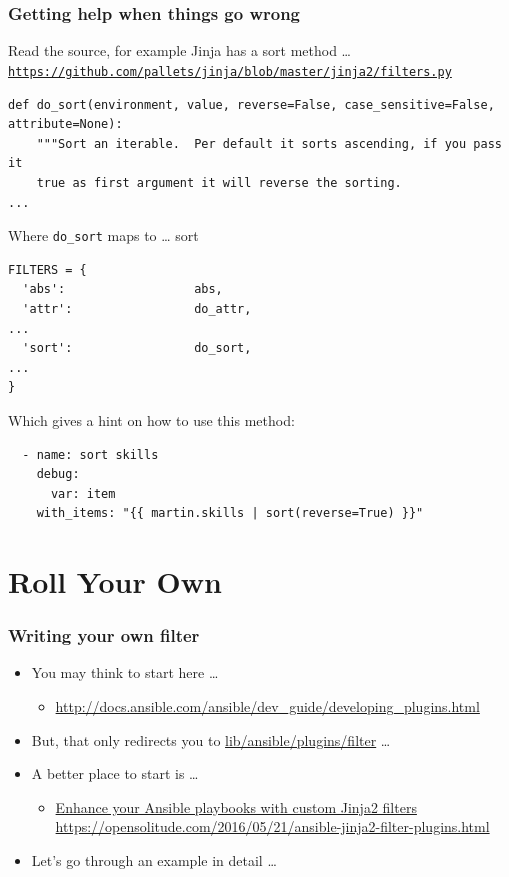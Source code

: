\documentclass[pdf]{beamer}
\begin{document}
\begin{frame}[fragile]
  \frametitle{Getting help when things go wrong}
  Read the source, for example Jinja has a sort method \ldots \newline
  \texttt{
    \tiny \url{https://github.com/pallets/jinja/blob/master/jinja2/filters.py}
  }
  \begin{lstlisting}
def do_sort(environment, value, reverse=False, case_sensitive=False, attribute=None):
    """Sort an iterable.  Per default it sorts ascending, if you pass it
    true as first argument it will reverse the sorting.
...
  \end{lstlisting}
  Where \texttt{do\_sort} maps to \ldots \pause{} sort
  \begin{lstlisting}
FILTERS = {
  'abs':                  abs,
  'attr':                 do_attr,
...
  'sort':                 do_sort,
...
}
  \end{lstlisting}
  \pause{}
  Which gives a hint on how to use this method:
  \begin{lstlisting}
  - name: sort skills
    debug:
      var: item
    with_items: "{{ martin.skills | sort(reverse=True) }}"
  \end{lstlisting}
\end{frame}

\section{Roll Your Own}

\begin{frame}
  \frametitle{Writing your own filter}
  \begin{itemize}[<+->]
    \item[] You may think to start here \ldots
      \begin{itemize}
        \item<1-> \small \url{http://docs.ansible.com/ansible/dev_guide/developing_plugins.html}
      \end{itemize}
    \item[] But, that only redirects you to \href{https://github.com/ansible/ansible/blob/devel/lib/ansible/plugins/filter/core.py}{lib/ansible/plugins/filter} \ldots
    \item[] A better place to start is \ldots
      \begin{itemize}
        \item
          \href{https://opensolitude.com/2016/05/21/ansible-jinja2-filter-plugins.html}{Enhance
          your Ansible playbooks with custom Jinja2 filters} \newline
        \small \url{https://opensolitude.com/2016/05/21/ansible-jinja2-filter-plugins.html}
      \end{itemize}
    \item[] Let's go through an example in detail \ldots
  \end{itemize}
\end{frame}
\end{document}
